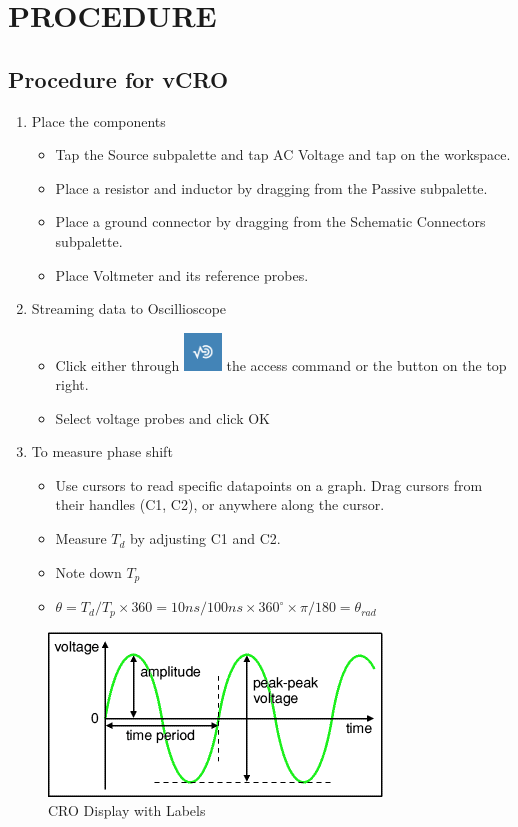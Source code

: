 \documentclass{article}
\begin{document}
\section{\LARGE PROCEDURE}
\subsection{Procedure for vCRO}
\begin{enumerate}
\item Place the components
\begin{itemize}
\item Tap the Source subpalette and tap AC Voltage and tap on the workspace.
\item Place a resistor and inductor by dragging from the Passive subpalette.
\item Place a ground connector by dragging from the Schematic Connectors subpalette.
\item Place Voltmeter and its reference probes.
\end{itemize}
\newpage
\item Streaming data to Oscillioscope
\begin{itemize}
\item Click either through \includegraphics[width = 1cm, height = 1cm]{stream.png} the access command or the button on the top right.
\item Select voltage probes and click OK
\end{itemize}
\item To measure phase shift
\begin{itemize}
\item Use cursors to read specific datapoints on a graph. Drag cursors from their handles (C1, C2), or anywhere along the cursor. 
\item Measure $T_d$ by adjusting C1 and C2.
\item Note down $T_p$
\item $
\theta=T_{d} / T_{p} \times 360=10 n s / 100 n s \times 360^{\circ} \times \pi/180 =\theta_{rad}
$

\end{itemize}
\end{enumerate}
\begin{figure}[h]
    \centering
    \includegraphics[width = 10cm \textwidth]{lissajous.png}
    \caption{CRO Display with Labels}
\end{figure}
\newpage
\end{document}
